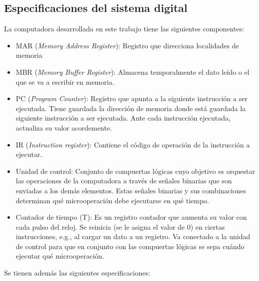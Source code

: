\documentclass{article}
\begin{document}
\subsection{Especificaciones del sistema digital}

La computadora desarrollada en este trabajo tiene las siguientes componentes:

\begin{itemize}
    \item MAR (\textit{Memory Address Register}): Registro que direcciona localidades de memoria
    
    \item MBR (\textit{Memory Buffer Register}): Almacena temporalmente el dato leído o el que se va a escribir en memoria.
    
    \item PC (\textit{Program Counter}): Registro que apunta a la siguiente instrucción a ser ejecutada. Tiene guardada la dirección de memoria donde está guardada la siguiente instrucción a ser ejecutada. Ante cada instrucción ejecutada, actualiza su valor acordemente.
    
    \item IR (\textit{Instruction register}): Contiene el código de operación de la instrucción a ejecutar.
    
    \item Unidad de control: Conjunto de compuertas lógicas cuyo objetivo es orquestar las operaciones de la computadora a través de señales binarias que son enviadas a los demás elementos. Estas señales binarias y sus combinaciones determinan qué microoperación debe ejecutarse en qué tiempo.
    
    \item Contador de tiempo (T): Es un registro contador que aumenta su valor con cada pulso del reloj. Se reinicia (se le asigna el valor de $0$) en ciertas instrucciones, e.g., al cargar un dato a un registro. Va conectado a la unidad de control para que en conjunto con las compuertas lógicas se sepa cuándo ejecutar qué microoperación.
    
\end{itemize}
    
Se tienen además las siguientes especificaciones:
\end{document}
